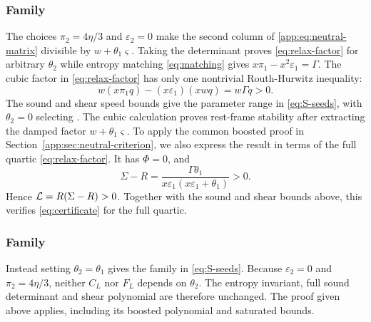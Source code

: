 \subsubsection*{Family }
\label{app:family:S2}
The choices $\pi_2=4\eta/3$ and $\varepsilon_2=0$ make the second
column of \eqref{app:eq:neutral-matrix} divisible by
$w+\theta_1\varsigma$. Taking the determinant proves
\eqref{eq:relax-factor} for arbitrary $\theta_2$ while
entropy matching \eqref{eq:matching} gives $x\pi_1-x^2\varepsilon_1=\Gamma$.
The cubic factor in \eqref{eq:relax-factor} has only one nontrivial
Routh-Hurwitz inequality:
\begin{equation}
 w(x\pi_1q)-(x\varepsilon_1)(xwq)=w\Gamma q>0.
\end{equation}
The sound and shear speed bounds give the parameter range in
\eqref{eq:S-seeds}, with $\theta_2=0$ selecting .
The cubic calculation proves rest-frame stability after extracting the
damped factor $w+\theta_1\varsigma$. To apply the common boosted proof in
Section~\ref{app:sec:neutral-criterion}, we also express the result in
terms of the full quartic \eqref{eq:relax-factor}. It has $\Phi=0$, and
\begin{equation}\label{app:eq:neutral-s2-speeds}
 \Sigma-R=\frac{\Gamma\theta_1}
 {x\varepsilon_1(x\varepsilon_1+\theta_1)}>0.
\end{equation}
Hence $\mathcal L=R(\Sigma-R)>0$. Together with the sound and shear bounds
above, this verifies \eqref{eq:certificate} for the full quartic.


\subsubsection*{Family }
\label{app:family:S3}
Instead setting $\theta_2=\theta_1$ gives the family  in \eqref{eq:S-seeds}.
Because $\varepsilon_2=0$ and $\pi_2=4\eta/3$, neither $C_L$ nor $F_L$
depends on $\theta_2$. The entropy invariant, full sound determinant
and shear polynomial are therefore unchanged. The  proof given above applies,
including its boosted polynomial and saturated bounds.


